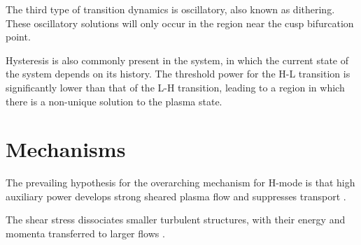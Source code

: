 The third type of transition dynamics is oscillatory, also known as dithering.
These oscillatory solutions will only occur in the region near the cusp bifurcation point.

Hysteresis is also commonly present in the system, in which the current state of the system depends on its history.
The threshold power for the H-L transition is significantly lower than that of the L-H transition, leading to a region in which there is a non-unique solution to the plasma state.


\section{Mechanisms}
The prevailing hypothesis for the overarching mechanism for H-mode is that high auxiliary power develops strong sheared plasma flow and suppresses transport \cite{freidberg_plasma_2007}.

The shear stress dissociates smaller turbulent structures, with their energy and momenta transferred to larger flows \cite{staps_backstepping_2017}.

